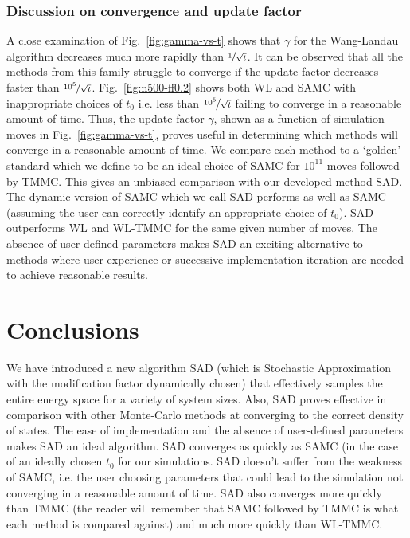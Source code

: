 \documentclass[letterpaper,twocolumn,amsmath,amssymb,pre,aps,10pt]{revtex4-1}
\begin{document}
\subsubsection{Discussion on convergence and update factor}

A close examination of Fig.~\ref{fig:gamma-vs-t} shows that $\gamma$
for the Wang-Landau algorithm decreases much more rapidly than
$\nicefrac{1}{\sqrt{t}}$. It can be observed that all the methods from
this family struggle to converge if the update factor decreases faster
than $\nicefrac{10^5}{\sqrt{t}}$. Fig.~\ref{fig:n500-ff0.2} shows both
WL and SAMC with inappropriate choices of $t_0$ i.e. less than
$\nicefrac{10^5}{\sqrt{t}}$ failing to converge in a reasonable amount
of time. Thus, the update factor $\gamma$, shown as a function of
simulation moves in Fig.~\ref{fig:gamma-vs-t}, proves useful in
determining which methods will converge in a reasonable amount of time.
We compare each method to a `golden' standard which we define to be an
ideal choice of SAMC for $10^{11}$ moves followed by TMMC.  This gives an
unbiased comparison with our developed method SAD. The dynamic version
of SAMC which we call SAD performs as well as SAMC (assuming the user
can correctly identify an appropriate choice of $t_0$).  SAD
outperforms WL and WL-TMMC for the same given number of moves. The
absence of user defined parameters makes SAD an exciting alternative to
methods where user experience or successive implementation iteration
are needed to achieve reasonable results.

\section{Conclusions}

We have introduced a new algorithm SAD (which is Stochastic Approximation
with the modification factor dynamically chosen) that effectively
samples the entire energy space for a variety of system sizes.  Also,
SAD proves effective in comparison with other Monte-Carlo methods at
converging to the correct density of states.  The ease of
implementation and the absence of user-defined parameters makes SAD an
ideal algorithm. SAD converges as quickly as SAMC (in the case of an ideally
chosen $t_0$ for our simulations. SAD doesn't suffer from the weakness of SAMC,
i.e. the user choosing parameters that could lead to the simulation not
converging in a reasonable amount of time. SAD also converges more quickly
than TMMC (the reader will remember that SAMC followed by TMMC is what each
method is compared against) and much more quickly than WL-TMMC.
\end{document}
